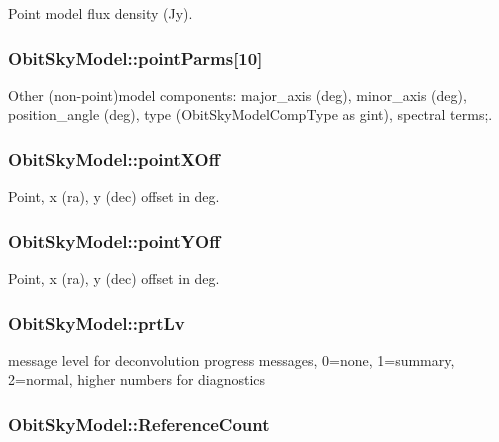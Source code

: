 Point model flux density (Jy). 

\subsubsection{ {\bf Obit\-Sky\-Model::point\-Parms}[10]}\label{structObitSkyModel_o26}


Other (non-point)model components: major\_\-axis (deg), minor\_\-axis (deg), position\_\-angle (deg), type (Obit\-Sky\-Model\-Comp\-Type as gint), spectral terms;. 

\subsubsection{ {\bf Obit\-Sky\-Model::point\-XOff}}\label{structObitSkyModel_o24}


Point, x (ra), y (dec) offset in deg. 

\subsubsection{ {\bf Obit\-Sky\-Model::point\-YOff}}\label{structObitSkyModel_o25}


Point, x (ra), y (dec) offset in deg. 

\subsubsection{ {\bf Obit\-Sky\-Model::prt\-Lv}}\label{structObitSkyModel_o51}


message level for deconvolution progress messages, 0=none, 1=summary, 2=normal, higher numbers for diagnostics 

\subsubsection{ {\bf Obit\-Sky\-Model::Reference\-Count}}\label{structObitSkyModel_o2}


